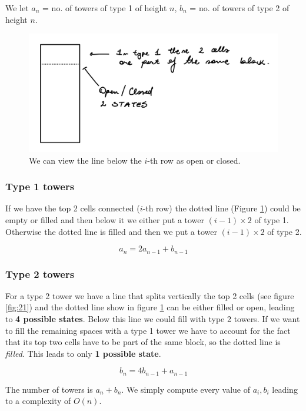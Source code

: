 We let $a_n$ = no. of towers of type 1 of height $n$, $b_n$ = no. of towers of type 2 of height $n$.

\begin{figure}[!ht]
    \centering
    \includegraphics[width=0.75\linewidth]{Pictures/2-2.png}
    \caption{We can view the line below the $i$-th row as open or closed.}
    \label{fig:22}
\end{figure}

\subsubsection{Type 1 towers}
If we have the top 2 cells connected ($i$-th row) the dotted line (Figure \ref{fig:22}) could be empty or filled and then below it we either put a tower $(i - 1) \times 2$ of type 1. Otherwise the dotted line is filled and then we put a tower $(i - 1) \times 2$ of type 2.

\begin{equation}
    a_n = 2a_{n-1} + b_{n-1}
\end{equation}

\subsubsection{Type 2 towers}
For a type 2 tower we have a line that splits vertically the top 2 cells (see figure \ref{fig:21}) and the dotted line show in figure \ref{fig:22} can be either filled or open, leading to \textbf{4 possible states}. Below this line we could fill with type 2 towers. If we want to fill the remaining spaces with a type 1 tower we have to account for the fact that its top two cells have to be part of the same block, so the dotted line is \textit{filled}. This leads to only \textbf{1 possible state}.

\begin{equation}
    b_n = 4b_{n-1} + a_{n-1}
\end{equation}

The number of towers is $a_n + b_n$. We simply compute every value of $a_i, b_i$ leading to a complexity of $O(n)$.

